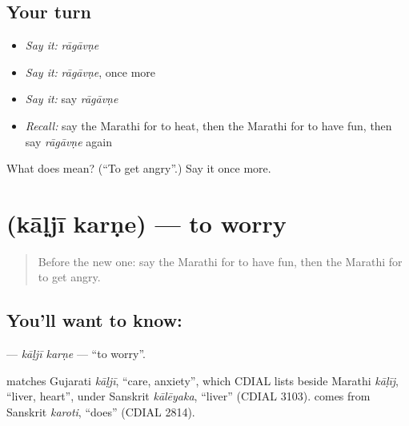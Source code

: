\subsection*{Your turn}
\begin{itemize}
\raggedright
  \item \emph{Say it:} \emph{rāgāvṇe}
  \item \emph{Say it:} \emph{rāgāvṇe}, once more
  \item \emph{Say it:} say \emph{rāgāvṇe}
  \item \emph{Recall:} say the Marathi for to heat, then the Marathi for to have fun, then say \emph{rāgāvṇe} again
\end{itemize}

\begin{tcolorbox}[breakable,colback=teal!4,colframe=teal!35!black,title={Before you move on}]
What does  mean? (\textquotedblleft{}To get angry\textquotedblright{}.) Say it once more.
\end{tcolorbox}
\section[\texorpdfstring{\mr{काळजी} \mr{करणे} (kāḷjī karṇe)}{काळजी करणे (kāḷjī karṇe)}]{  (kāḷjī karṇe) — to worry}

\label{lesson:MR-C252-kalji-karne}



\begin{quote}
Before the new one: say the Marathi for to have fun, then the Marathi for to get angry.
\end{quote}

\subsection*{You'll want to know:  }
\textbf{ } — \emph{kāḷjī karṇe} — \textquotedblleft{}to worry\textquotedblright{}.

\begin{cousinweb}
\textbf{} matches Gujarati \emph{kāḷjī}, \textquotedblleft{}care, anxiety\textquotedblright{}, which CDIAL lists beside Marathi \emph{kāḷīj}, \textquotedblleft{}liver, heart\textquotedblright{}, under Sanskrit \emph{kālēyaka}, \textquotedblleft{}liver\textquotedblright{} (CDIAL 3103). \textbf{} comes from Sanskrit \emph{karoti}, \textquotedblleft{}does\textquotedblright{} (CDIAL 2814).
\end{cousinweb}

